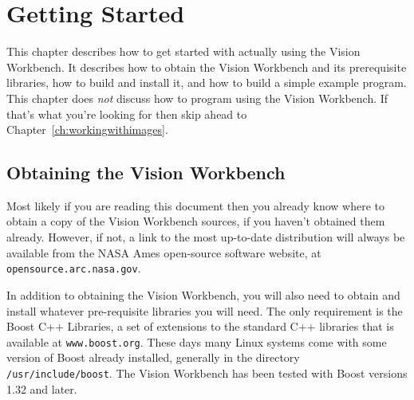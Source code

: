\chapter{Getting Started}\label{ch:gettingstarted}

This chapter describes how to get started with actually using the
Vision Workbench.  It describes how to obtain the Vision Workbench and
its prerequisite libraries, how to build and install it, and how to
build a simple example program.  This chapter does {\it not} discuss
how to program using the Vision Workbench.  If that's what you're
looking for then skip ahead to Chapter~\ref{ch:workingwithimages}.

\section{Obtaining the Vision Workbench}

Most likely if you are reading this document then you already know 
where to obtain a copy of the Vision Workbench sources, if you haven't 
obtained them already.  However, if not, a link to the most up-to-date 
distribution will always be available from the NASA Ames open-source 
software website, at \verb#opensource.arc.nasa.gov#.

In addition to obtaining the Vision Workbench, you will also need to 
obtain and install whatever pre-requisite libraries you will need.  
The only requirement is the Boost C++ Libraries, a set of extensions 
to the standard C++ libraries that is available at \verb#www.boost.org#.
These days many Linux systems come with some version of Boost already 
installed, generally in the directory \verb#/usr/include/boost#.  The 
Vision Workbench has been tested with Boost versions 1.32 and later.


